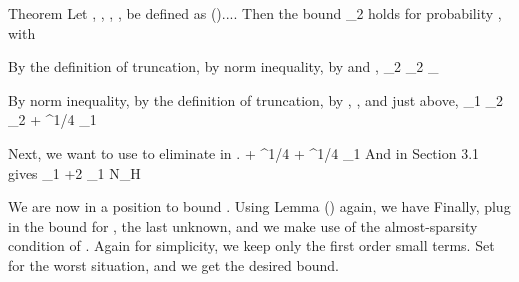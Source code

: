 \Result
{Theorem}
{
Let , , , ,  be defined as ()....
Then the bound
%
 {
\NC {} _2
\leq {}  \D {} \NR
}
%
holds for probability , with
%
}

By the definition of truncation, by  norm inequality, by  and ,
%
 {
\NC {} _2
\leq \NC {} _2 \NR
\NC \leq \NC {}  _\infty \NR
\NC \leq {}  \NR
}

By  norm inequality, by the definition of truncation, by , , and  just above,
%
 {
\NC {} _1
\leq \NC {}  _2 \NR
\NC \leq \NC {}  _2 \NR
\NC \leq {} 
+ {  ^{1/4}}  _1 \NR
}

Next, we want to use  to eliminate  in .
%
 {
\NC \leq {} 
+ {  ^{1/4}}  \NR
\NC \leq {} 
+ {  ^{1/4}}  _1 \NR
}
%
And  in Section 3.1 gives
%
 {
\NC {} _1
\leq {} 
+2 _1 \NR
\NC \leq \NC {} \log N_H \NR
}

We are now in a position to bound .
Using Lemma () again, we have
%
%
Finally, plug in the bound for , the last unknown, and we make use of the almost-sparsity condition of .
Again for simplicity, we keep only the first order small terms.
%
%
Set  for the worst situation, and we get the desired bound.

\stopsubsection
\stopsection


